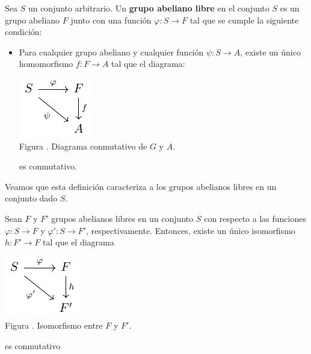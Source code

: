 \documentclass[12pt]{report}
\theoremstyle{largebreak}
\newcommand\cf[3]{\ensuremath{#1:#2\rightarrow#3}}
\newcounter{figcount}
\begin{document}
    \begin{mydef}
        Sea $S$ un conjunto arbitrario. Un \textbf{grupo abeliano libre} en el conjunto $S$ es un grupo abeliano $F$ junto con una función $\cf{\varphi}{S}{F}$ tal que se cumple la siguiente condición:
        \begin{itemize}
            \item Para cualquier grupo abeliano y cualquier función $\cf{\psi}{S}{A}$, existe un único homomorfismo $\cf{f}{F}{A}$ tal que el diagrama:
            
            \begin{minipage}{\textwidth}
                \begin{center}
                    \includegraphics[scale=1.5]{images/fig_2.pdf}\\
                    Figura \thefigcount. Diagrama conmutativo de $G$ y $A$.
                \end{center}
            \end{minipage}
            
            es conmutativo.
        \end{itemize}
    \end{mydef}

    Veamos que esta definición caracteriza a los grupos abelianos libres en un conjunto dado $S$.

    \begin{propo}
        Sean $F$ y $F'$ grupos abelianos libres en un conjunto $S$ con respecto a las funciones $\cf{\varphi}{S}{F}$ y $\cf{\varphi'}{S}{F'}$, respectivamente. Entonces, existe un único isomorfismo $\cf{h}{F'}
        {F}$ tal que el diagrama
        
        \begin{minipage}{\textwidth}
            \begin{center}
                \includegraphics[scale=1.5]{images/fig_6.pdf}\\
                Figura \thefigcount. Isomorfismo entre $F$ y $F'$.
            \end{center}
        \end{minipage}

        es conmutativo
    \end{propo}
\end{document}
